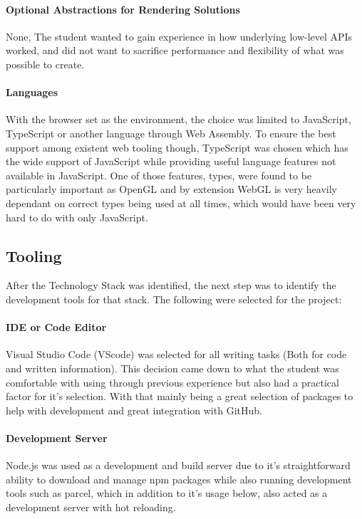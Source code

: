\paragraph{Optional Abstractions for Rendering Solutions}
None, The student wanted to gain experience in how underlying low-level APIs worked, and did not want to sacrifice performance and flexibility of what was possible to create.

\paragraph{Languages}
With the browser set as the environment, the choice was limited to JavaScript, TypeScript or another language through Web Assembly. To ensure the best support among existent web tooling though, TypeScript was chosen which has the wide support of JavaScript while providing useful language features not available in JavaScript. One of those features, types, were found to be particularly important as OpenGL and by extension WebGL is very heavily dependant on correct types being used at all times, which would have been very hard to do with only JavaScript.

\subsection{Tooling}
After the Technology Stack was identified, the next step was to identify the development tools for that stack. The following were selected for the project:

\paragraph{IDE or Code Editor}
Visual Studio Code (VScode) was selected for all writing tasks (Both for code and written information). This decision came down to what the student was comfortable with using through previous experience but also had a practical factor for it's selection. With that mainly being a great selection of packages to help with development and great integration with GitHub.

\paragraph{Development Server}
Node.js was used as a development and build server due to it's straightforward ability to download and manage npm packages while also running development tools such as parcel, which in addition to it's usage below, also acted as a development server with hot reloading.

